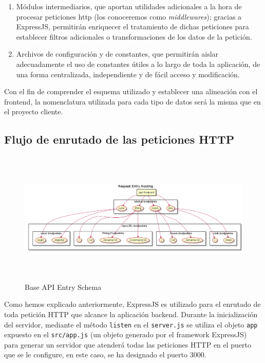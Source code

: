\begin{enumerate}
 \item Módulos intermediarios, que aportan utilidades adicionales a la hora de procesar peticiones http (los conoceremos como \textit{middlewares}); gracias a ExpressJS, permitirán enriquecer el tratamiento de dichas peticiones para establecer filtros adicionales o transformaciones de los datos de la petición.
 \item Archivos de configuración y de constantes, que permitirán aislar adecuadamente el uso de constantes útiles a lo largo de toda la aplicación, de una forma centralizada, independiente y de fácil acceso y modificación.
\end{enumerate}

\vspace{0.5cm}

Con el fin de comprender el esquema utilizado y establecer una alineación con el frontend, la nomenclatura utilizada para cada tipo de datos será la misma que en el proyecto cliente.

\subsection{Flujo de enrutado de las peticiones HTTP}
\label{ch:Capitulo4.6.3}

\begin{figure}[hbt!]
\centering
\includegraphics[height=2.5in]{figures/diagrams/back/router-flow/api-entry.png}
\caption[api-entry]{Base API Entry Schema\footnotemark}
\label{fig:back-api-entry}
\end{figure}

Como hemos explicado anteriormente, ExpressJS es utilizado para el enrutado de toda petición HTTP que alcance la aplicación backend. Durante la inicialización del servidor, mediante el método \verb|listen| en el \verb|server.js| se utiliza el objeto \verb|app| expuesto en el \verb|src/app.js| (un objeto generado por el framework ExpressJS) para generar un servidor que atenderá todas las peticiones HTTP en el puerto que se le configure, en este caso, se ha designado el puerto 3000.

